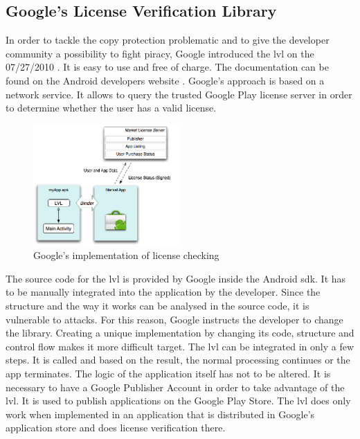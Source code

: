 \subsection{Google's License Verification Library} \label{section:license-google}
In order to tackle the copy protection problematic and to give the developer community a possibility to fight piracy, Google introduced the \gls{lvl} on the 07/27/2010 \cite{developersLicensingBlog}.
It is easy to use and free of charge.
The documentation can be found on the Android developers website \cite{developersLicensingOverview}.
\newline
Google's approach is based on a network service.
It allows to query the trusted Google Play license server in order to determine whether the user has a valid license.
\newline
\begin{figure}[h]
    \centering
    \includegraphics[width=0.5\textwidth]{data/lvl.png}
    \caption{Google's implementation of license checking \cite{developersLicensingOverview}}
    \label{fig:lvl}
\end{figure}
The source code for the \gls{lvl} is provided by Google inside the Android \gls{sdk}.
It has to be manually integrated into the application by the developer.
Since the structure and the way it works can be analysed in the source code, it is vulnerable to attacks.
For this reason, Google instructs the developer to change the library.
Creating a unique implementation by changing its code, structure and control flow makes it more difficult target.
\newline
The \gls{lvl} can be integrated in only a few steps.
It is called and based on the result, the normal processing continues or the app terminates.
The logic of the application itself has not to be altered.
\newline
It is necessary to have a Google Publisher Account in order to take advantage of the \gls{lvl}.
It is used to publish applications on the Google Play Store.
The \gls{lvl} does only work when implemented in an application that is distributed in Google's application store and does license verification there.

